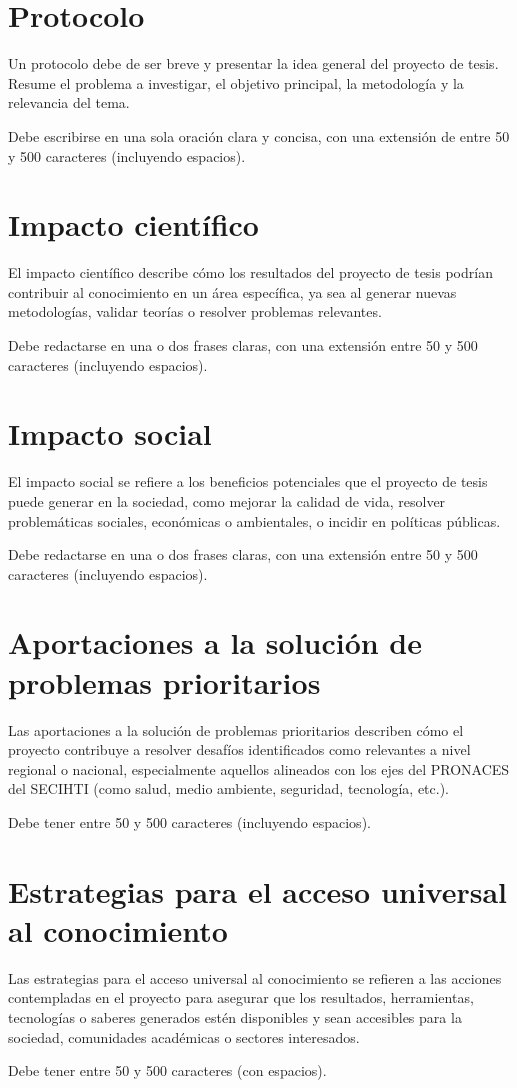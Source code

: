 \section{Protocolo}

Un protocolo debe de ser breve y presentar la idea general del proyecto de tesis. Resume el problema a investigar, el objetivo principal, la metodología y la relevancia del tema.

Debe escribirse en una sola oración clara y concisa, con una extensión de entre 50 y 500 caracteres (incluyendo espacios).

\section{Impacto científico}

El impacto científico describe cómo los resultados del proyecto de tesis podrían contribuir al conocimiento en un área específica, ya sea al generar nuevas metodologías, validar teorías o resolver problemas relevantes.

Debe redactarse en una o dos frases claras, con una extensión entre 50 y 500 caracteres (incluyendo espacios).

\section{Impacto social}

El impacto social se refiere a los beneficios potenciales que el proyecto de tesis puede generar en la sociedad, como mejorar la calidad de vida, resolver problemáticas sociales, económicas o ambientales, o incidir en políticas públicas.

Debe redactarse en una o dos frases claras, con una extensión entre 50 y 500 caracteres (incluyendo espacios).

\section{Aportaciones a la solución de problemas prioritarios}

Las aportaciones a la solución de problemas prioritarios describen cómo el proyecto contribuye a resolver desafíos identificados como relevantes a nivel regional o nacional, especialmente aquellos alineados con los ejes del PRONACES del SECIHTI (como salud, medio ambiente, seguridad, tecnología, etc.).

Debe tener entre 50 y 500 caracteres (incluyendo espacios).

\section{Estrategias para el acceso universal al conocimiento}

Las estrategias para el acceso universal al conocimiento se refieren a las acciones contempladas en el proyecto para asegurar que los resultados, herramientas, tecnologías o saberes generados estén disponibles y sean accesibles para la sociedad, comunidades académicas o sectores interesados.

Debe tener entre 50 y 500 caracteres (con espacios).